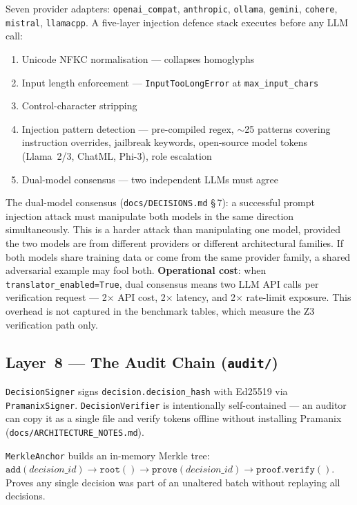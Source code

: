 \documentclass[12pt,a4paper,oneside]{report}
\newcommand{\fname}[1]{\texttt{#1}}          %
\newcommand{\code}[1]{\texttt{#1}}           %
\newcommand{\cfrsec}[1]{\S\,#1}             %
\begin{document}
Seven provider adapters: \code{openai\_compat}, \code{anthropic},
\code{ollama}, \code{gemini}, \code{cohere}, \code{mistral},
\code{llamacpp}. A five-layer injection defence stack executes before any LLM
call:

\begin{enumerate}
  \item Unicode NFKC normalisation --- collapses homoglyphs
  \item Input length enforcement --- \code{InputTooLongError} at
        \code{max\_input\_chars}
  \item Control-character stripping
  \item Injection pattern detection --- pre-compiled regex, $\sim$25 patterns
        covering instruction overrides, jailbreak keywords, open-source model
        tokens (Llama~2/3, ChatML, Phi-3), role escalation
  \item Dual-model consensus --- two independent LLMs must agree
\end{enumerate}

The dual-model consensus (\fname{docs/DECISIONS.md} \cfrsec{7}): a successful
prompt injection attack must manipulate both models in the same direction
simultaneously.  This is a harder attack than manipulating one model, provided
the two models are from different providers or different architectural families.
If both models share training data or come from the same provider family, a
shared adversarial example may fool both.  \textbf{Operational cost}: when
\code{translator\_enabled=True}, dual consensus means two LLM API calls per
verification request --- 2$\times$ API cost, 2$\times$ latency, and 2$\times$
rate-limit exposure.  This overhead is not captured in the benchmark tables,
which measure the Z3 verification path only.

\subsection{Layer~8 --- The Audit Chain (\fname{audit/})}

\code{DecisionSigner} signs \code{decision.decision\_hash} with Ed25519 via
\code{PramanixSigner}. \code{DecisionVerifier} is intentionally
self-contained --- an auditor can copy it as a single file and verify tokens
offline without installing Pramanix (\fname{docs/ARCHITECTURE\_NOTES.md}).

\code{MerkleAnchor} builds an in-memory Merkle tree:
$\code{add}(\mathit{decision\_id}) \to \code{root}() \to
\code{prove}(\mathit{decision\_id}) \to \code{proof.verify}()$. Proves any
single decision was part of an unaltered batch without replaying all decisions.
\end{document}
